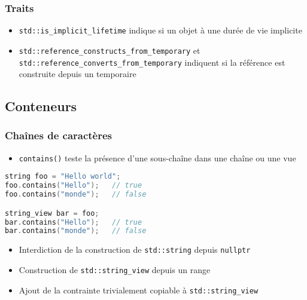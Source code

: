 \documentclass[C++.tex]{subfiles}
\begin{document}
\begin{frame}[fragile]
	\frametitle{Traits}
	\begin{itemize}
		\item \lstinline|std::is_implicit_lifetime| indique si un objet à une durée de vie implicite
		\item \lstinline|std::reference_constructs_from_temporary| et \lstinline|std::reference_converts_from_temporary| indiquent si la référence est construite depuis un temporaire
	\end{itemize}
\end{frame}

\subsection*{Conteneurs}
\begin{frame}[fragile]
	\frametitle{Chaînes de caractères}
	\begin{itemize}
		\item \lstinline|contains()| teste la présence d'une sous-chaîne dans une chaîne ou une vue
	\end{itemize}

	\begin{lstlisting}[language=C++]
string foo = "Hello world";
foo.contains("Hello");   // true
foo.contains("monde");   // false

string_view bar = foo;
bar.contains("Hello");   // true
bar.contains("monde");   // false\end{lstlisting}


	\begin{itemize}
		\item Interdiction de la construction de \lstinline|std::string| depuis \lstinline|nullptr|


		\item Construction de \lstinline|std::string_view| depuis un range
		\item Ajout de la contrainte trivialement copiable à \lstinline|std::string_view|
	\end{itemize}


\end{frame}
\end{document}
